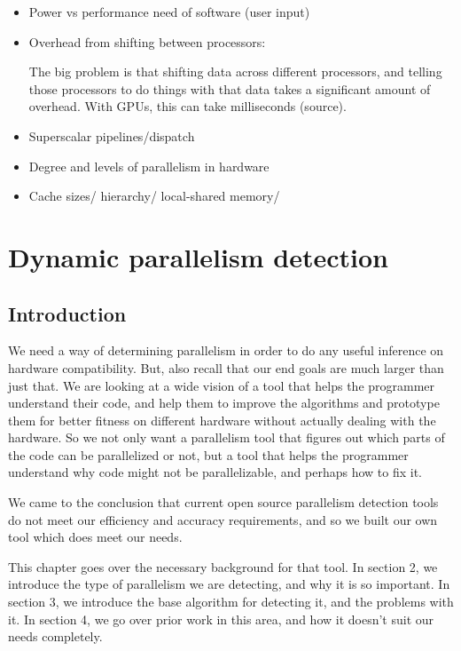 \documentclass[12pt,twoside]{reedthesis}
\begin{document}
	\begin{itemize}
		\item Power vs performance need of software (user input)

		\item Overhead from shifting between processors:

		The big problem is that shifting data across different processors, and telling those processors to do things with that data takes a significant amount of overhead. With GPUs, this can take milliseconds (source).

		\item Superscalar pipelines/dispatch

		\item Degree and levels of parallelism in hardware

		\item Cache sizes/ hierarchy/ local-shared memory/

	\end{itemize}

\chapter{Dynamic parallelism detection}

	\section{Introduction}
		We need a way of determining parallelism in order to do any useful inference on hardware compatibility. But, also recall that our end goals are much larger than just that. We are looking at a wide vision of a tool that helps the programmer understand their code, and help them to improve the algorithms and prototype them for better fitness on different hardware without actually dealing with the hardware. So we not only want a parallelism tool that figures out which parts of the code can be parallelized or not, but a tool that helps the programmer understand why code might not be parallelizable, and perhaps how to fix it. 
		 
		We came to the conclusion that current open source parallelism detection tools do not meet our efficiency and accuracy requirements, and so we built our own tool which does meet our needs. 
		
		This chapter goes over the necessary background for that tool. In section 2, we introduce the type of parallelism we are detecting, and why it is so important. In section 3, we introduce the base algorithm for detecting it, and the problems with it. In section 4, we go over prior work in this area, and how it doesn't suit our needs completely. 
		
\end{document}
